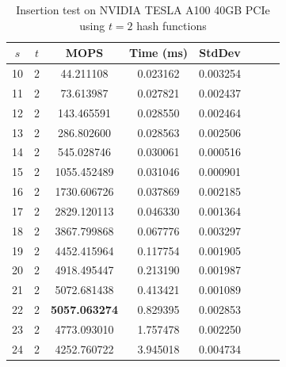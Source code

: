 \documentclass[10pt,twocolumn,letterpaper]{article}
\begin{document}
\begin{table}[h]
    \centering
   \begin{tabular}{@{}c|ccccccc@{}}
\toprule
$s$  & $t$ & MOPS    & Time (ms)& StdDev  \\ \midrule
10 & 2 & 44.211108 & 0.023162 & 0.003254 \\
11 & 2 & 73.613987 & 0.027821 & 0.002437 \\
12 & 2 & 143.465591 & 0.028550 & 0.002464 \\
13 & 2 & 286.802600 & 0.028563 & 0.002506 \\
14 & 2 & 545.028746 & 0.030061 & 0.000516 \\
15 & 2 & 1055.452489 & 0.031046 & 0.000901 \\
16 & 2 & 1730.606726 & 0.037869 & 0.002185 \\
17 & 2 & 2829.120113 & 0.046330 & 0.001364 \\
18 & 2 & 3867.799868 & 0.067776 & 0.003297 \\
19 & 2 & 4452.415964 & 0.117754 & 0.001905 \\
20 & 2 & 4918.495447 & 0.213190 & 0.001987 \\
21 & 2 & 5072.681438 & 0.413421 & 0.001089 \\
22 & 2 & \textbf{5057.063274} & 0.829395 & 0.002853 \\
23 & 2 & 4773.093010 & 1.757478 & 0.002250 \\
24 & 2 & 4252.760722 & 3.945018 & 0.004734 \\
\bottomrule
\end{tabular}
    \caption{Insertion test on NVIDIA TESLA A100 40GB PCIe using $t = 2$ hash functions}
    \label{tab:insert_2_A100}
\end{table}
\end{document}
